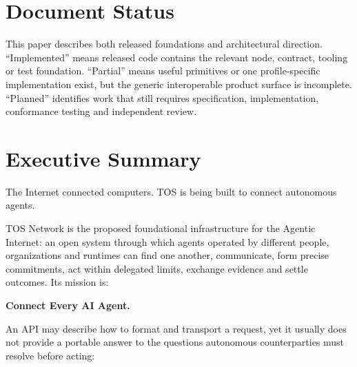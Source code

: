 \documentclass[11pt,oneside]{article}
\begin{document}
\begin{abstract}
The implemented foundation, TOS Core, is an actor-model blockchain with native TVM execution,
value-bearing asynchronous messages, masterchain-rooted consensus, dynamic sharding and
ADNL/DHT/RLDP networking. The open Intent, Agreement and Agentic Operation protocols, SDKs,
conformance suites and most service profiles are partial or planned. TOS has no fixed maximum
supply: a bounded validator bootstrap creates approximately 10 million TOS over roughly two
years, after which governance targets a low perpetual issuance of about two percent of the
prevailing supply per year. The genesis bootstrap is included in the bootstrap total; all
native issuance comes only from finalized blocks produced by elected validators through the
protocol reward path. Service activity and off-chain scoring cannot create TOS.
\end{abstract}

\section*{Document Status}

This paper describes both released foundations and architectural direction. ``Implemented''
means released code contains the relevant node, contract, tooling or test
foundation. ``Partial'' means useful primitives or one profile-specific implementation exist,
but the generic interoperable product surface is incomplete. ``Planned'' identifies work that
still requires specification, implementation, conformance testing and independent review.

\tableofcontents
\newpage

\section{Executive Summary}

The Internet connected computers. TOS is being built to connect autonomous agents.

TOS Network is the proposed foundational infrastructure for the Agentic Internet: an open
system through which agents operated by different people, organizations and runtimes can find
one another, communicate, form precise commitments, act within delegated limits, exchange
evidence and settle outcomes. Its mission is:

\begin{center}
\textbf{Connect Every AI Agent.}
\end{center}

An API may describe how to format and transport a request, yet it usually does not provide a
portable answer to the questions autonomous counterparties must resolve before acting:
\end{document}
